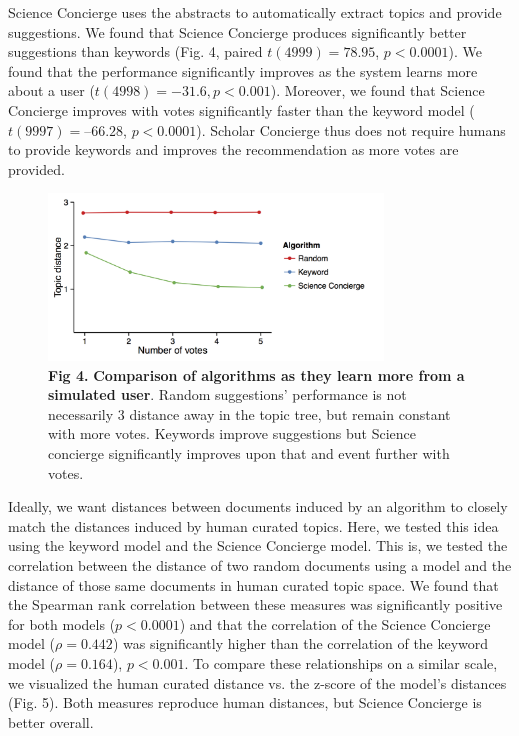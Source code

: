 \documentclass[a4paper]{article}
\begin{document}
Science Concierge uses the abstracts to automatically extract topics and provide suggestions. We found that Science Concierge produces significantly better suggestions than keywords (Fig. 4, paired $t(4999) = 78.95$, $p < 0.0001$). We found that the performance significantly improves as the system learns more about a user ($t(4998) = -31.6, p < 0.001$). Moreover, we found that Science Concierge improves with votes significantly faster than the keyword model ($t(9997) = –66.28$, $p < 0.0001$). Scholar Concierge thus does not require humans to provide keywords and improves the recommendation as more votes are provided.


\begin{figure}[!ht]
\centering
\includegraphics[width=3.5in]{performance_vs_vote}
\caption*{\textbf{Fig 4.} \textbf{Comparison of algorithms as they learn more from a simulated user}. Random suggestions’ performance is not necessarily 3 distance away in the topic tree, but remain constant with more votes. Keywords improve suggestions but Science concierge significantly improves upon that and event further with votes.}
\end{figure}

Ideally, we want distances between documents induced by an algorithm to closely match the distances induced by human curated topics. Here, we tested this idea using the keyword model and the Science Concierge model. This is, we tested the correlation between the distance of two random documents using a model and the distance of those same documents in human curated topic space. We found that the Spearman rank correlation between these measures was significantly positive for both models ($p < 0.0001$) and that the correlation of the Science Concierge model ($\rho=0.442$) was significantly higher than the correlation of the keyword model ($\rho=0.164$), $p < 0.001$. To compare these relationships on a similar scale, we visualized the human curated distance vs. the z-score of the model’s distances (Fig. 5). Both measures reproduce human distances, but Science Concierge is better overall.
\end{document}

